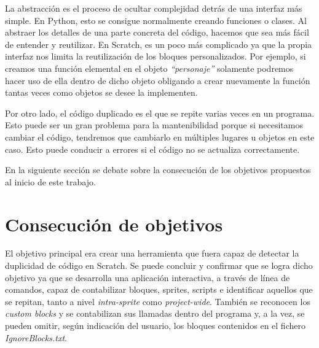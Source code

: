 \documentclass[a4paper, 12pt]{book}
\begin{document}
La abstracción es el proceso de ocultar complejidad detrás de una interfaz más simple. En Python, esto se consigue normalmente creando funciones o clases. Al abstraer los detalles de una parte concreta del código, hacemos que sea más fácil de entender y reutilizar. En Scratch, es un poco más complicado ya que la propia interfaz nos limita la reutilización de los bloques personalizados. Por ejemplo, si creamos una función elemental en el objeto \textit{``personaje''} solamente podremos hacer uso de ella dentro de dicho objeto obligando a crear nuevamente la función tantas veces como objetos se desee la implementen.

Por otro lado, el código duplicado es el que se repite varias veces en un programa. Esto puede ser un gran problema para la mantenibilidad porque si necesitamos cambiar el código, tendremos que cambiarlo en múltiples lugares u objetos en este caso. Esto puede conducir a errores si el código no se actualiza correctamente.

En la siguiente sección se debate sobre la consecución de los objetivos propuestos al inicio de este trabajo. 

\section{Consecución de objetivos}
\label{sec:consecucion-objetivos}





El objetivo principal era crear una herramienta que fuera capaz de detectar la duplicidad de código en Scratch. Se puede concluir y confirmar que se logra dicho objetivo ya que se desarrolla una aplicación interactiva, a través de línea de comandos, capaz de contabilizar bloques, sprites, scripts e identificar aquellos que se repitan, tanto a nivel \textit{intra-sprite} como \textit{project-wide}. También se reconocen los \textit{custom blocks} y se contabilizan sus llamadas dentro del programa y, a la vez, se pueden omitir, según indicación del usuario, los bloques contenidos en el fichero \textit{IgnoreBlocks.txt}.
\end{document}
